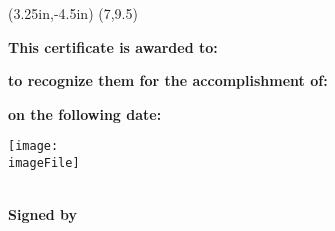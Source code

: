 \documentclass[12pt,a4paper]{article}
\begin{document}
\begin{titlepage}
\begin{landscape}
\begin{center}

\thisfancyput(3.25in,-4.5in){%
	\setlength{\unitlength}{1in}\fancyoval(7,9.5)}

\huge\textbf{This certificate is awarded to:}

\medskip

\Huge\textbf{\awardee}

\bigskip

\huge\textbf{to recognize them for the accomplishment of:}

\medskip

\Huge\textbf{\awardType}

\bigskip

\huge\textbf{on the following date:}

\medskip

\Huge\textbf{\awardDate}

\vfill

\texttt{[image: \\imageFile]}

\underline{\hspace{6cm}}\\
\smallskip
\large\textbf{Signed by \givenBy}

\end{center}
\end{landscape}
\end{titlepage}
\end{document}
